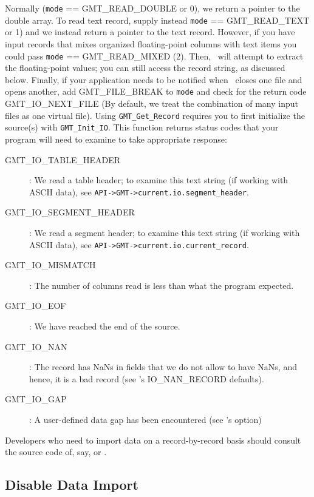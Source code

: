 \documentclass{report}
\begin{document}
Normally (\texttt{mode} == GMT\_READ\_DOUBLE or 0), we return a pointer to the double array.
To read text record, supply instead \texttt{mode} == GMT\_READ\_TEXT or 1) and we
instead return a pointer to the text record.
However, if you have input records that mixes organized floating-point columns with text
items you could pass \texttt{mode} == GMT\_READ\_MIXED (2).  Then, \GMT\ will attempt to extract the
floating-point values; you can still access the record string, as discussed below.
Finally, if your application needs to be notified when \GMT\ closes one file and opens another,
add GMT\_FILE\_BREAK to \texttt{mode} and check for the return code GMT\_IO\_NEXT\_FILE (By
default, we treat the combination of many input files as one virtual file).
Using \texttt{GMT\_Get\_Record} requires you to first initialize the source(s)
with \texttt{GMT\_Init\_IO}.  This function returns status codes that your
program will need to examine to take appropriate response:
\begin{description}
\item [GMT\_IO\_TABLE\_HEADER]: We read a table header; to examine this text string
(if working with ASCII data), see \texttt{API->GMT->current.io.segment\_header}.
\item [GMT\_IO\_SEGMENT\_HEADER]: We read a segment header; to examine this text string
(if working with ASCII data), see \texttt{API->GMT->current.io.current\_record}.
\item [GMT\_IO\_MISMATCH]: The number of columns read is less than what the program expected.
\item [GMT\_IO\_EOF]: We have reached the end of the source.
\item [GMT\_IO\_NAN]: The record has NaNs in fields that we do not allow to have NaNs, and
hence, it is a bad record (see \GMT's IO\_NAN\_RECORD defaults). 
\item [GMT\_IO\_GAP]: A user-defined data gap has been encountered (see \GMT's  option)
\end{description}
Developers who need to import data on a record-by-record basis should consult the source
code of, say,  or .

\subsection{Disable Data Import}
\end{document}
